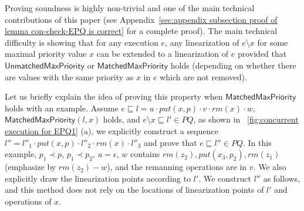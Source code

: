 Proving soundness is highly non-trivial and one of the main technical contributions of this paper (see Appendix~\ref{sec:appendix subsection proof of lemma con-check-EPQ is correct} for a complete proof). The main technical difficulty is showing that for any execution $e$, any linearization of $e\setminus x$ for some maximal priority value $x$ can be extended to a linearization of $e$ provided that $\mathsf{UnmatchedMaxPriority}$ or $\mathsf{MatchedMaxPriority}$ holds (depending on whether there are values with the same priority as $x$ in $e$ which are not removed).
%
%
%
%
%
%

Let us briefly explain the idea of proving this property when $\mathsf{MatchedMaxPriority}$ holds with an example. Assume $e \sqsubseteq l=u \cdot \textit{put}(x,p) \cdot v \cdot \textit{rm}(x) \cdot w$, $\mathsf{MatchedMaxPriority}(l,x)$ holds, and $e \setminus x \sqsubseteq l' \in \textit{PQ}$, as shown in \figurename~\ref{fig:concurrent execution for EPQ1} (a), we explicitly construct a sequence $l''= l''_1 \cdot \textit{put}(x,p) \cdot l''_2 \cdot \textit{rm}(x) \cdot l''_3$ and prove that $e \sqsubseteq l'' \in \textit{PQ}$. In this example, $p_1 \prec p$, $p_1 \prec p_2$, $u=\epsilon$, $w$ contains $\textit{rm}(z_2), \textit{put}(x_3,p_2), \textit{rm}(z_1)$ (emphasize by $\textit{rm}(z_2)-w$), and the remanning operations are in $v$. We also explicitly draw the linearization points according to $l'$. We construct $l''$ as follows, and this method does not rely on the locations of linearization points of $l'$ and operations of $x$.

